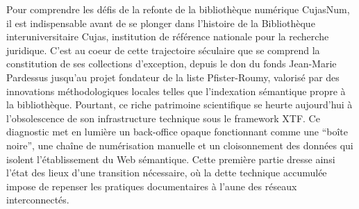 \documentclass[12pt,twoside]{book}
\begin{document}
Pour comprendre les défis de la refonte de la bibliothèque numérique CujasNum, il est indispensable avant de se plonger dans l'histoire de la Bibliothèque interuniversitaire Cujas, institution de référence nationale pour la recherche juridique. C'est au coeur de cette trajectoire séculaire que se comprend la constitution de ses collections d'exception, depuis le don du fonds Jean-Marie Pardessus jusqu'au projet fondateur de la liste Pfister-Roumy, valorisé par des innovations méthodologiques locales telles que l'indexation sémantique propre à la bibliothèque. Pourtant, ce riche patrimoine scientifique se heurte aujourd'hui à l'obsolescence de son infrastructure technique sous le framework XTF. Ce diagnostic met en lumière un back-office opaque fonctionnant comme une \enquote{boîte noire}, une chaîne de numérisation manuelle et un cloisonnement des données qui isolent l'établissement du Web sémantique. Cette première partie dresse ainsi l'état des lieux d'une transition nécessaire, où la dette technique accumulée impose de repenser les pratiques documentaires à l'aune des réseaux interconnectés.






\end{document}
